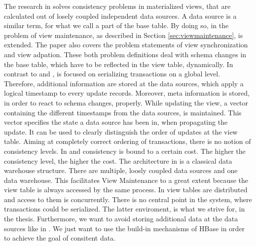 \documentclass[11pt,a4paper,bibtotoc,idxtotoc,headsepline,footsepline,footexclude,BCOR12mm,DIV13]{scrbook}
\begin{document}
The research in  \cite{chen:multiversion} solves consistency problems in materialized views, that are calculated out of losely coupled independent data sources. A data source is a similar term, for what we call a part of the base table. By doing so, in \cite{chen:multiversion} the problem of view maintenance, as described in Section \ref{sec:viewmaintenance}, is extended. The paper also covers the problem statements of view synchronization and view adpation. These both problem definitions deal with schema changes in the base table, which have to be reflected in the view table, dynamically. In contrast to \cite{jacobsen:viewmaintenance} and \cite{agrawal:asynchronous},  \cite{chen:multiversion} is focused on serializing transactions on a global level. Therefore, additional information are stored at the data sources, which apply a logical timestamp to every update records. Moreover, meta information is stored, in order to react to schema changes, properly. While updating the view, a vector containing the different timestamps from the data sources, is maintained. This vector specifies the state a data source has been in, when propagating the update. It can be used to clearly distinguish the order of updates at the view table. Aiming at completely correct ordering of transactions, there is no notion of consistency levels. In \cite{jacobsen:viewmaintenance} and \cite{agrawal:asynchronous} consistency is bound to a certain cost. The higher the consistency level, the higher the cost. The architecture in \cite{chen:multiversion} is a classical data warehouse structure. There are multiple, loosly coupled data sources and one data warehouse. This facilitates View Maintenance to a great extent because the view table is always accessed by the same process. In \cite{jacobsen:viewmaintenance} view tables are distributed and access to them is concurrently. There is no central point in the system, where transactions could be serialized. The latter enviroment, is what we strive for, in the thesis. Furthermore, we want to avoid storing additional data at the data sources like in \cite{chen:multiversion}. We just want to use the build-in mechanisms of HBase in order to achieve the goal of consitent data. 
\end{document}
